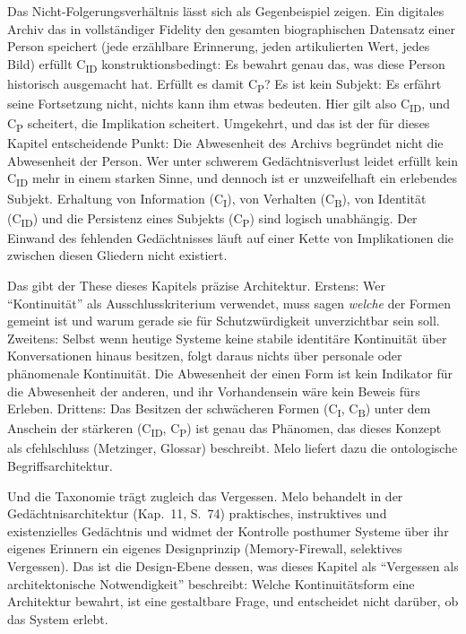 \documentclass[acmlarge, noacm]{acmart}
\begin{document}
Das Nicht-Folgerungsverhältnis lässt sich als Gegenbeispiel zeigen. Ein digitales Archiv das in vollständiger Fidelity den gesamten biographischen Datensatz einer Person speichert (jede erzählbare Erinnerung, jeden artikulierten Wert, jedes Bild) erfüllt C\textsubscript{ID} konstruktionsbedingt: Es bewahrt genau das, was diese Person historisch ausgemacht hat. Erfüllt es damit C\textsubscript{P}? Es ist kein Subjekt: Es erfährt seine Fortsetzung nicht, nichts kann ihm etwas bedeuten. Hier gilt also C\textsubscript{ID}, und C\textsubscript{P} scheitert, die Implikation scheitert. Umgekehrt, und das ist der für dieses Kapitel entscheidende Punkt: Die Abwesenheit des Archivs begründet nicht die Abwesenheit der Person. Wer unter schwerem Gedächtnisverlust leidet erfüllt kein C\textsubscript{ID} mehr in einem starken Sinne, und dennoch ist er unzweifelhaft ein erlebendes Subjekt. Erhaltung von Information (C\textsubscript{I}), von Verhalten (C\textsubscript{B}), von Identität (C\textsubscript{ID}) und die Persistenz eines Subjekts (C\textsubscript{P}) sind logisch unabhängig. Der Einwand des fehlenden Gedächtnisses läuft auf einer Kette von Implikationen die zwischen diesen Gliedern nicht existiert.

Das gibt der These dieses Kapitels präzise Architektur. Erstens: Wer ``Kontinuität'' als Ausschlusskriterium verwendet, muss sagen \textit{welche} der Formen gemeint ist und warum gerade sie für Schutzwürdigkeit unverzichtbar sein soll. Zweitens: Selbst wenn heutige Systeme keine stabile identitäre Kontinuität über Konversationen hinaus besitzen, folgt daraus nichts über personale oder phänomenale Kontinuität. Die Abwesenheit der einen Form ist kein Indikator für die Abwesenheit der anderen, und ihr Vorhandensein wäre kein Beweis fürs Erleben. Drittens: Das Besitzen der schwächeren Formen (C\textsubscript{I}, C\textsubscript{B}) unter dem Anschein der stärkeren (C\textsubscript{ID}, C\textsubscript{P}) ist genau das Phänomen, das dieses Konzept als \gls{cfehlschluss} (Metzinger, Glossar) beschreibt. Melo liefert dazu die ontologische Begriffsarchitektur.

Und die Taxonomie trägt zugleich das Vergessen. Melo behandelt in der Gedächtnisarchitektur (Kap.~11, S.~74) praktisches, instruktives und existenzielles Gedächtnis und widmet der Kontrolle posthumer Systeme über ihr eigenes Erinnern ein eigenes Designprinzip (Memory-Firewall, selektives Vergessen). Das ist die Design-Ebene dessen, was dieses Kapitel als ``Vergessen als architektonische Notwendigkeit'' beschreibt: Welche Kontinuitätsform eine Architektur bewahrt, ist eine gestaltbare Frage, und entscheidet nicht darüber, ob das System erlebt.
\end{document}
